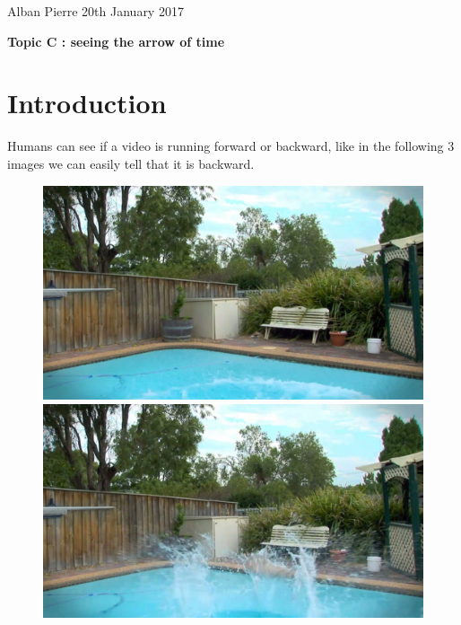 \documentclass[10pt,a4paper]{report}
\begin{document}
	Alban Pierre
	\newline
	20th January 2017
	\newline
	\begin{center}
		\textbf{\Large{Topic C : seeing the arrow of time}}
		\newline
	\end{center}
	
	\section*{Introduction}
	
	Humans can see if a video is running forward or backward, like in the following 3 images we can easily tell that it is backward.
	\newline
	\begin{figure}[h]
		\begin{minipage}[b]{.30\linewidth}
			\includegraphics[width=1.0\textwidth]{im01.jpeg}
		\end{minipage}
		\hspace{5pt}
		\begin{minipage}[b]{0.30\linewidth}
			\includegraphics[width=1.0\textwidth]{im30.jpeg}

\end{minipage}
\end{figure}
\end{document}

